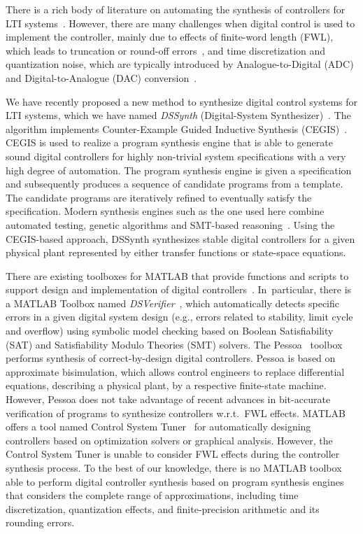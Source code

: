 \documentclass[10pt,conference]{IEEEtran}
\begin{document}
There is a rich body of literature on automating the synthesis of
controllers for LTI systems~\cite{mazo2010pessoa,
DBLP:conf/emsoft/RavanbakhshS16, economakos2016automated}.  However, there
are many challenges when digital control is used to implement the
controller, mainly due to effects of finite-word length (FWL), which leads
to truncation or round-off errors~\cite{Guang2013, Istepanian2001}, and time
discretization and quantization noise, which are typically introduced by
Analogue-to-Digital (ADC) and Digital-to-Analogue (DAC)
conversion~\cite{astrom1997computer}.

We have recently proposed a new method to synthesize digital control systems
for LTI systems, which we have named \emph{DSSynth} (Digital-System
Synthesizer)~\cite{abate2017, abatecav2017}.  The algorithm implements
Counter-Example Guided Inductive Synthesis
(CEGIS)~\cite{DBLP:conf/asplos/Solar-LezamaTBSS06}.  CEGIS is used to
realize a program synthesis engine that is able to generate sound digital
controllers for highly non-trivial system specifications with a very high
degree of automation.  The program synthesis engine is given a specification
and subsequently produces a sequence of candidate programs from a template. 
The candidate programs are iteratively refined to eventually satisfy the
specification.  Modern synthesis engines such as the one used here combine
automated testing, genetic algorithms and SMT-based
reasoning~\cite{DBLP:journals/corr/AlurFSS16a, DBLP:conf/lpar/DavidKL15}. 
Using the CEGIS-based approach, DSSynth synthesizes stable digital
controllers for a given physical plant represented by either transfer
functions or state-space equations.

There are existing toolboxes for MATLAB that provide functions and scripts
to support design and implementation of digital
controllers~\cite{matlab-toolbox}.  In~particular, there is a MATLAB Toolbox
named \emph{DSVerifier}~\cite{issta2017, DBLP:journals/tc/BessaIPCF17,
DBLP:journals/dafes/BessaICF16}, which automatically detects specific errors
in a given digital system design (e.g., errors related to stability, limit
cycle and overflow) using symbolic model checking based on Boolean
Satisfiability (SAT) and Satisfiability Modulo Theories (SMT) solvers.  The
Pessoa~\cite{mazo2010pessoa} toolbox performs synthesis of correct-by-design
digital controllers.  Pessoa is based on approximate bisimulation, which
allows control engineers to replace differential equations, describing a
physical plant, by a respective finite-state machine.  However, Pessoa does
not take advantage of recent advances in bit-accurate verification of
programs to synthesize controllers w.r.t.~FWL effects.  MATLAB 
offers a tool named Control System Tuner~\cite{autotuner} for
automatically designing controllers based on optimization solvers or
graphical analysis.  However, the Control System Tuner is unable to consider
FWL effects during the controller synthesis process.  To the best of our
knowledge, there is no MATLAB toolbox able to perform digital controller
synthesis based on program synthesis engines that considers the complete
range of approximations, including time discretization, quantization
effects, and finite-precision arithmetic and its rounding errors.
\end{document}
